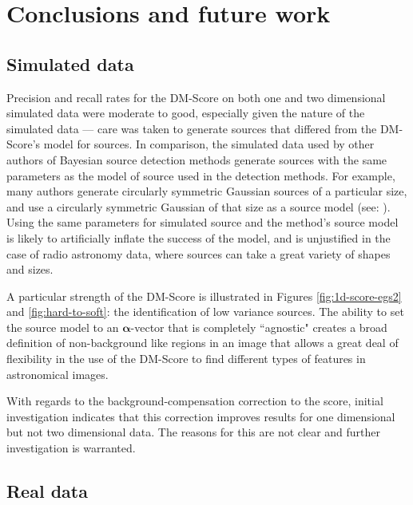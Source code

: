 
\section{Conclusions and future work}

\subsection{Simulated data}

Precision and recall rates for the DM-Score on both one and two dimensional simulated data were moderate to good, especially given the nature of the simulated data --- care was taken to generate sources that differed from the DM-Score's model for sources. In comparison, the simulated data used by other authors of Bayesian source detection methods generate sources with the same parameters as the model of source used in the detection methods. For example, many authors generate circularly symmetric Gaussian sources of a particular size, and use a circularly symmetric Gaussian of that size as a source model (see: \cite{feroz2008multimodal,hobson2003bayesian,savage2007bayesian}). Using the same parameters for simulated source and the method's source model is likely to artificially inflate the success of the model, and is unjustified in the case of radio astronomy data, where sources can take a great variety of shapes and sizes.

A particular strength of the DM-Score is illustrated in Figures \ref{fig:1d-score-egs2} and \ref{fig:hard-to-soft}: the identification of low variance sources. The ability to set the source model to an $\boldsymbol{\alpha}$-vector that is completely ``agnostic" creates a broad definition of non-background like regions in an image that allows a great deal of flexibility in the use of the DM-Score to find different types of features in astronomical images.

With regards to the background-compensation correction to the score, initial investigation indicates that this correction improves results for one dimensional but not two dimensional data. The reasons for this are not clear and further investigation is warranted.

\subsection{Real data}

